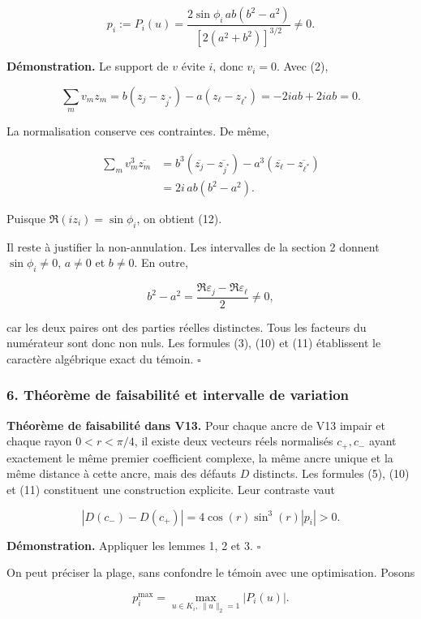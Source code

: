 \documentclass[
  10pt,
  a4paper,
]{article}
\begin{document}
\[
p_i:=P_i(u)=
\frac{2\sin\phi_i\,ab(b^2-a^2)}{[2(a^2+b^2)]^{3/2}}\ne0. \tag{12}
\]

\textbf{Démonstration.} Le support de \(v\) évite \(i\), donc \(v_i=0\).
Avec (2),

\[
\sum_m v_mz_m
=b(z_j-z_{j^*})-a(z_\ell-z_{\ell^*})
=-2iab+2iab=0.
\]

La normalisation conserve ces contraintes. De même,

\[
\begin{aligned}
\sum_m v_m^3\overline{z_m}
&=b^3(\overline{z_j}-\overline{z_{j^*}})
-a^3(\overline{z_\ell}-\overline{z_{\ell^*}})\\
&=2i\,ab(b^2-a^2).
\end{aligned}
\]

Puisque \(\Re(iz_i)=\sin\phi_i\), on obtient (12).

Il reste à justifier la non-annulation. Les intervalles de la section 2
donnent \(\sin\phi_i\ne0\), \(a\ne0\) et \(b\ne0\). En outre,

\[
b^2-a^2=\frac{\Re\varepsilon_j-\Re\varepsilon_\ell}{2}\ne0,
\]

car les deux paires ont des parties réelles distinctes. Tous les
facteurs du numérateur sont donc non nuls. Les formules (3), (10) et
(11) établissent le caractère algébrique exact du témoin. \(\square\)

\hypertarget{thuxe9oruxe8me-de-faisabilituxe9-et-intervalle-de-variation}{%
\subsubsection{6. Théorème de faisabilité et intervalle de
variation}\label{thuxe9oruxe8me-de-faisabilituxe9-et-intervalle-de-variation}}

\textbf{Théorème de faisabilité dans V13.} Pour chaque ancre de V13
impair et chaque rayon \(0<r<\pi/4\), il existe deux vecteurs réels
normalisés \(c_+,c_-\) ayant exactement le même premier coefficient
complexe, la même ancre unique et la même distance à cette ancre, mais
des défauts \(D\) distincts. Les formules (5), (10) et (11) constituent
une construction explicite. Leur contraste vaut

\[
|D(c_-)-D(c_+)|=4\cos(r)\sin^3(r)|p_i|>0. \tag{13}
\]

\textbf{Démonstration.} Appliquer les lemmes 1, 2 et 3. \(\square\)

On peut préciser la plage, sans confondre le témoin avec une
optimisation. Posons

\[
p_i^{\max}=\max_{u\in K_i,\,\|u\|_2=1}|P_i(u)|.
\]
\end{document}
